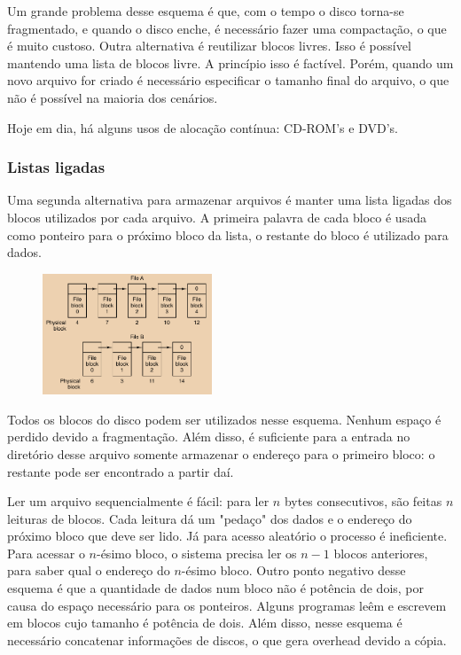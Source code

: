 \documentclass{article}
\begin{document}
Um grande problema desse esquema é que, com o tempo o disco torna-se fragmentado, e quando o disco enche, é necessário fazer uma compactação, o que é muito custoso. Outra alternativa é reutilizar blocos livres. Isso é possível mantendo uma lista de blocos livre. A princípio isso é factível. Porém, quando um novo arquivo for criado é necessário especificar o tamanho final do arquivo, o que não é possível na maioria dos cenários.

Hoje em dia, há alguns usos de alocação contínua: CD-ROM's e DVD's.

\subsubsection{Listas ligadas}

Uma segunda alternativa para armazenar arquivos é manter uma lista ligadas dos blocos utilizados por cada arquivo. A primeira palavra de cada bloco é usada como ponteiro para o próximo bloco da lista, o restante do bloco é utilizado para dados.

\begin{figure}[h]
  \begin{center}
    \includegraphics[width=0.45\textwidth]{img/5-9.png}
  \end{center}
  \caption{}
  \label{fig:}
\end{figure}

Todos os blocos do disco podem ser utilizados nesse esquema. Nenhum espaço é perdido devido a fragmentação. Além disso, é suficiente para a entrada no diretório desse arquivo somente armazenar o endereço para o primeiro bloco: o restante pode ser encontrado a partir daí. 

Ler um arquivo sequencialmente é fácil: para ler $n$ bytes consecutivos, são feitas $n$ leituras de blocos. Cada leitura dá um "pedaço" dos dados e o endereço do próximo bloco que deve ser lido. Já para acesso aleatório o processo é ineficiente. Para acessar o $n$-ésimo bloco, o sistema precisa ler os $n-1$ blocos anteriores, para saber qual o endereço do $n$-ésimo bloco. Outro ponto negativo desse esquema é que a quantidade de dados num bloco não é potência de dois, por causa do espaço necessário para os ponteiros. Alguns programas leêm e escrevem em blocos cujo tamanho é potência de dois. Além disso, nesse esquema é necessário concatenar informações de discos, o que gera overhead devido a cópia.
\end{document}
